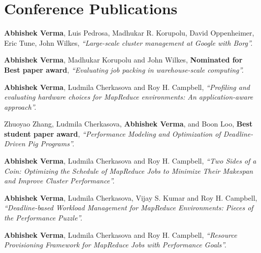 \documentclass[11pt,a4paper]{moderncv}
\begin{document}
\section{Conference Publications}

 {\textbf{Abhishek Verma}, Luis Pedrosa, Madhukar R. Korupolu, David Oppenheimer, Eric Tune, John Wilkes,  \textit{``Large-scale cluster management at Google with Borg''.}}


 {\textbf{Abhishek Verma}, Madhukar Korupolu and John Wilkes, \quad \textbf{Nominated for Best paper award}, \textit{``Evaluating job packing in warehouse-scale computing''.}}

 {\textbf{Abhishek Verma}, Ludmila Cherkasova and Roy H. Campbell,  \textit{``Profiling and evaluating hardware choices for MapReduce environments: An application-aware approach''.}}

 {Zhuoyao Zhang, Ludmila Cherkasova, \textbf{Abhishek Verma},  and Boon Loo, \quad \textbf{Best student paper award}, \textit{``Performance Modeling and Optimization of Deadline-Driven Pig Programs''.}}

 {\textbf{Abhishek Verma}, Ludmila Cherkasova and Roy H. Campbell,  \textit{``Two Sides of a Coin: Optimizing the Schedule of MapReduce Jobs to Minimize Their Makespan and Improve Cluster Performance''.}}

 {\textbf{Abhishek Verma}, Ludmila Cherkasova, Vijay S. Kumar and Roy H. Campbell,  \textit{``Deadline-based Workload Management for MapReduce Environments: Pieces of the Performance Puzzle''.}}

 {\textbf{Abhishek Verma}, Ludmila Cherkasova and Roy H. Campbell, \textit{``Resource Provisioning Framework for MapReduce Jobs with Performance Goals''.}}


\end{document}
